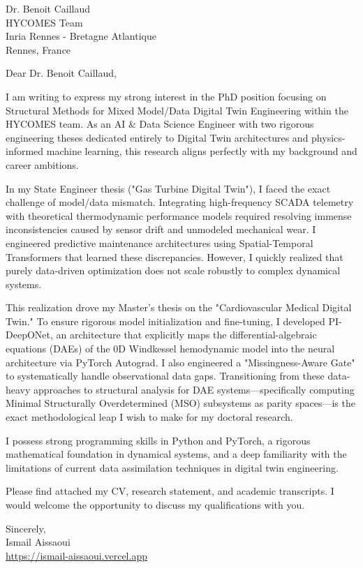 \documentclass[11pt, a4paper]{letter}
\begin{document}
\begin{letter}{Dr. Benoit Caillaud \\ HYCOMES Team \\ Inria Rennes - Bretagne Atlantique \\ Rennes, France}
\opening{Dear Dr. Benoit Caillaud,}

I am writing to express my strong interest in the PhD position focusing on Structural Methods for Mixed Model/Data Digital Twin Engineering within the HYCOMES team. As an AI \& Data Science Engineer with two rigorous engineering theses dedicated entirely to Digital Twin architectures and physics-informed machine learning, this research aligns perfectly with my background and career ambitions.

In my State Engineer thesis ("Gas Turbine Digital Twin"), I faced the exact challenge of model/data mismatch. Integrating high-frequency SCADA telemetry with theoretical thermodynamic performance models required resolving immense inconsistencies caused by sensor drift and unmodeled mechanical wear. I engineered predictive maintenance architectures using Spatial-Temporal Transformers that learned these discrepancies. However, I quickly realized that purely data-driven optimization does not scale robustly to complex dynamical systems.

This realization drove my Master's thesis on the "Cardiovascular Medical Digital Twin." To ensure rigorous model initialization and fine-tuning, I developed PI-DeepONet, an architecture that explicitly maps the differential-algebraic equations (DAEs) of the 0D Windkessel hemodynamic model into the neural architecture via PyTorch Autograd. I also engineered a "Missingness-Aware Gate" to systematically handle observational data gaps. Transitioning from these data-heavy approaches to structural analysis for DAE systems—specifically computing Minimal Structurally Overdetermined (MSO) subsystems as parity spaces—is the exact methodological leap I wish to make for my doctoral research.

I possess strong programming skills in Python and PyTorch, a rigorous mathematical foundation in dynamical systems, and a deep familiarity with the limitations of current data assimilation techniques in digital twin engineering. 

Please find attached my CV, research statement, and academic transcripts. I would welcome the opportunity to discuss my qualifications with you.

\closing{Sincerely, \\ Ismail Aissaoui \\ \href{https://ismail-aissaoui.vercel.app}{https://ismail-aissaoui.vercel.app}}
\end{letter}
\end{document}
